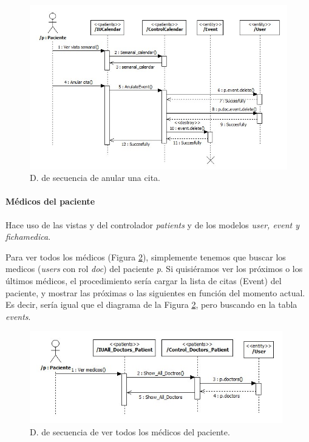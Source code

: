 					\begin{figure}[H]
					  \centering
					    \includegraphics[width=13.5cm]{img/jpg/secuencia/10_patients_calendar_anular.jpg}
					  \caption{D. de secuencia de anular una cita.}
					  \label{fig:cont_patient_calendar_anular}
					\end{figure}
					
			
				\paragraph{Médicos del paciente} %
				\label{subp:cont_medicos_del_paciente}
				
					Hace uso de las vistas y del controlador \textit{patients} y de los modelos \textit{user, event y fichamedica}.
					
					Para ver todos los médicos (Figura \ref{fig:cont_patient_docs}), simplemente tenemos que buscar los medicos (\textit{users} con rol \textit{doc}) del paciente \textit{p}. Si quisiéramos ver los próximos o los últimos médicos, el procedimiento sería cargar la lista de citas (Event) del paciente, y mostrar las próximas o las siguientes en función del momento actual. Es decir, sería igual que el diagrama de la Figura \ref{fig:cont_patient_docs}, pero buscando en la tabla \textit{events}.
					
					\begin{figure}[H]
					  \centering
					    \includegraphics[width=11cm]{img/jpg/secuencia/12_patients_alll_doctors.jpg}
					  \caption{D. de secuencia de ver todos los médicos del paciente.}
					  \label{fig:cont_patient_docs}
					\end{figure} 
					
